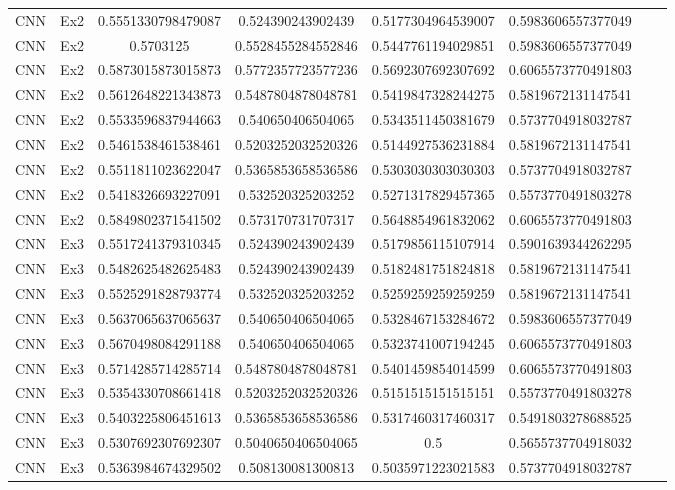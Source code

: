 \begin{appendices}
\begin{table}[H]
\begin{longtable}{ccccccll}
CNN & Ex2 & 0.5551330798479087 & 0.524390243902439 & 0.5177304964539007 & 0.5983606557377049 \\
CNN & Ex2 & 0.5703125 & 0.5528455284552846 & 0.5447761194029851 & 0.5983606557377049 \\
CNN & Ex2 & 0.5873015873015873 & 0.5772357723577236 & 0.5692307692307692 & 0.6065573770491803 \\
CNN & Ex2 & 0.5612648221343873 & 0.5487804878048781 & 0.5419847328244275 & 0.5819672131147541 \\
CNN & Ex2 & 0.5533596837944663 & 0.540650406504065 & 0.5343511450381679 & 0.5737704918032787 \\
CNN & Ex2 & 0.5461538461538461 & 0.5203252032520326 & 0.5144927536231884 & 0.5819672131147541 \\
CNN & Ex2 & 0.5511811023622047 & 0.5365853658536586 & 0.5303030303030303 & 0.5737704918032787 \\
CNN & Ex2 & 0.5418326693227091 & 0.532520325203252 & 0.5271317829457365 & 0.5573770491803278 \\
CNN & Ex2 & 0.5849802371541502 & 0.573170731707317 & 0.5648854961832062 & 0.6065573770491803 \\
CNN & Ex3 & 0.5517241379310345 & 0.524390243902439 & 0.5179856115107914 & 0.5901639344262295 \\
CNN & Ex3 & 0.5482625482625483 & 0.524390243902439 & 0.5182481751824818 & 0.5819672131147541 \\
CNN & Ex3 & 0.5525291828793774 & 0.532520325203252 & 0.5259259259259259 & 0.5819672131147541 \\
CNN & Ex3 & 0.5637065637065637 & 0.540650406504065 & 0.5328467153284672 & 0.5983606557377049 \\
CNN & Ex3 & 0.5670498084291188 & 0.540650406504065 & 0.5323741007194245 & 0.6065573770491803 \\
CNN & Ex3 & 0.5714285714285714 & 0.5487804878048781 & 0.5401459854014599 & 0.6065573770491803 \\
CNN & Ex3 & 0.5354330708661418 & 0.5203252032520326 & 0.5151515151515151 & 0.5573770491803278 \\
CNN & Ex3 & 0.5403225806451613 & 0.5365853658536586 & 0.5317460317460317 & 0.5491803278688525 \\
CNN & Ex3 & 0.5307692307692307 & 0.5040650406504065 & 0.5 & 0.5655737704918032 \\
CNN & Ex3 & 0.5363984674329502 & 0.508130081300813 & 0.5035971223021583 & 0.5737704918032787 \\ \hline
\end{longtable}
\end{table}



\end{appendices}
